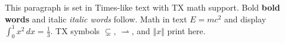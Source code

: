 \documentclass{article}
\begin{document}
This paragraph is set in Times-like text with TX math support.
Bold \textbf{bold words} and italic \textit{italic words} follow.
Math in text $E = mc^2$ and display $\int_0^1 x^2\,dx = \frac{1}{3}$.
TX symbols $\varsubsetneq$, $\rightharpoonup$, and $\Vert x \Vert$ print here.
\end{document}

